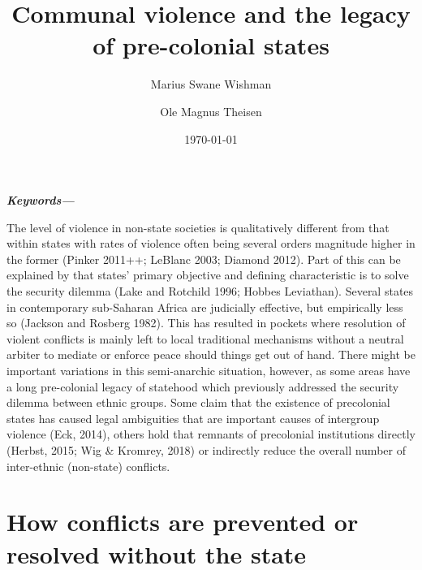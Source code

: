 \documentclass[12pt]{article}
\title{Communal violence and the legacy of pre-colonial states}
\author[$\dagger$]{Marius Swane Wishman}
\author[$\ddagger$]{Ole Magnus Theisen}
\affil[$\dagger,\ddagger$]{Department of Sociology and Political Science, NTNU}
\date{\today}
\providecommand{\keywords}[1]
{
	\small	
	\textbf{\textit{Keywords---}} #1
}
\begin{document}
\maketitle

\begin{abstract}
\end{abstract}

\keywords{}

\pagebreak

\onehalfspacing

The level of violence in non-state societies is qualitatively different from
that within states with rates of violence often being several orders magnitude
higher in the former (Pinker 2011++; LeBlanc 2003; Diamond 2012). Part of this
can be explained by that states’ primary objective and defining characteristic
is to solve the security dilemma (Lake and Rotchild 1996; Hobbes Leviathan).
Several states in contemporary sub-Saharan Africa are judicially effective, but
empirically less so (Jackson and Rosberg 1982). This has resulted in pockets
where resolution of violent conflicts is mainly left to local traditional
mechanisms without a neutral arbiter to mediate or enforce peace should things
get out of hand. There might be important variations in this semi-anarchic
situation, however, as some areas have a long pre-colonial legacy of statehood
which previously addressed the security dilemma between ethnic groups. Some
claim that the existence of precolonial states has caused legal ambiguities that
are important causes of intergroup violence (Eck, 2014), others hold that
remnants of precolonial institutions directly (Herbst, 2015; Wig \& Kromrey,
2018) or indirectly reduce the overall number of inter-ethnic (non-state)
conflicts. 

\section{How conflicts are prevented or resolved without the state}
\end{document}
